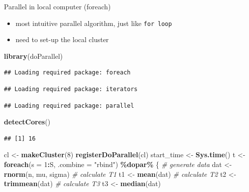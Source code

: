 \documentclass[
  ignorenonframetext,
]{beamer}
\newenvironment{Shaded}{\begin{snugshade}}{\end{snugshade}}
\newcommand{\AttributeTok}[1]{\textcolor[rgb]{0.13,0.29,0.53}{#1}}
\newcommand{\CommentTok}[1]{\textcolor[rgb]{0.56,0.35,0.01}{\textit{#1}}}
\newcommand{\DecValTok}[1]{\textcolor[rgb]{0.00,0.00,0.81}{#1}}
\newcommand{\FunctionTok}[1]{\textcolor[rgb]{0.13,0.29,0.53}{\textbf{#1}}}
\newcommand{\NormalTok}[1]{#1}
\newcommand{\OtherTok}[1]{\textcolor[rgb]{0.56,0.35,0.01}{#1}}
\newcommand{\SpecialCharTok}[1]{\textcolor[rgb]{0.81,0.36,0.00}{\textbf{#1}}}
\newcommand{\StringTok}[1]{\textcolor[rgb]{0.31,0.60,0.02}{#1}}
\providecommand{\tightlist}{%
  \setlength{\itemsep}{0pt}\setlength{\parskip}{0pt}}
\begin{document}
\begin{frame}[fragile]{Parallel in local computer (foreach)}
\protect{}\label{parallel-in-local-computer-foreach}
\begin{itemize}
\tightlist
\item
  most intuitive parallel algorithm, just like \texttt{for\ loop}
\item
  need to set-up the local cluster
\end{itemize}

\tiny

\begin{Shaded}
\begin{Highlighting}[]
\FunctionTok{library}\NormalTok{(doParallel)}
\end{Highlighting}
\end{Shaded}

\begin{verbatim}
## Loading required package: foreach
\end{verbatim}

\begin{verbatim}
## Loading required package: iterators
\end{verbatim}

\begin{verbatim}
## Loading required package: parallel
\end{verbatim}

\begin{Shaded}
\begin{Highlighting}[]
\FunctionTok{detectCores}\NormalTok{()}
\end{Highlighting}
\end{Shaded}

\begin{verbatim}
## [1] 16
\end{verbatim}

\begin{Shaded}
\begin{Highlighting}[]
\NormalTok{cl }\OtherTok{\textless{}{-}} \FunctionTok{makeCluster}\NormalTok{(}\DecValTok{8}\NormalTok{)}
\FunctionTok{registerDoParallel}\NormalTok{(cl)}
\NormalTok{start\_time }\OtherTok{\textless{}{-}} \FunctionTok{Sys.time}\NormalTok{()}
\NormalTok{t }\OtherTok{\textless{}{-}} \FunctionTok{foreach}\NormalTok{(}\AttributeTok{s =} \DecValTok{1}\SpecialCharTok{:}\NormalTok{S, }\AttributeTok{.combine =} \StringTok{"rbind"}\NormalTok{) }\SpecialCharTok{\%dopar\%}\NormalTok{ \{}
  \CommentTok{\# generate data}
\NormalTok{  dat }\OtherTok{\textless{}{-}} \FunctionTok{rnorm}\NormalTok{(n, mu, sigma)}
  \CommentTok{\# calculate T1}
\NormalTok{  t1 }\OtherTok{\textless{}{-}} \FunctionTok{mean}\NormalTok{(dat)}
  \CommentTok{\# calculate T2}
\NormalTok{  t2 }\OtherTok{\textless{}{-}} \FunctionTok{trimmean}\NormalTok{(dat)}
  \CommentTok{\# calculate T3}
\NormalTok{  t3 }\OtherTok{\textless{}{-}} \FunctionTok{median}\NormalTok{(dat)}


\end{Highlighting}
\end{Shaded}
\end{frame}
\end{document}
